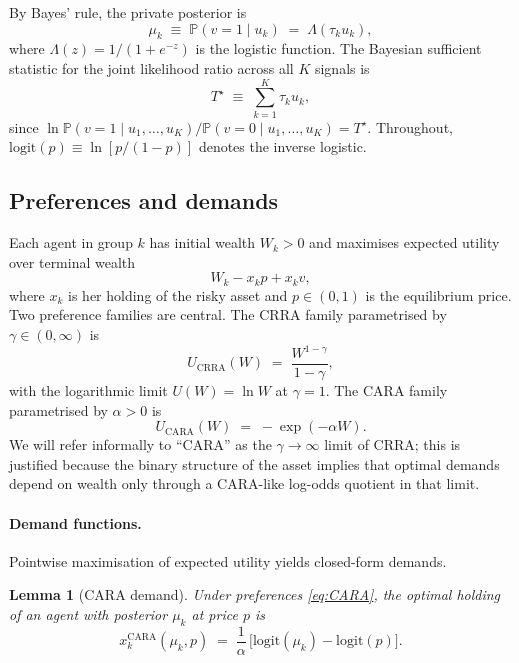 \documentclass[12pt,letterpaper]{article}
\newtheorem{lemma}{Lemma}
\theoremstyle{definition}
\theoremstyle{remark}
\newcommand{\PP}{\mathbb{P}}
\newcommand{\Lam}{\Lambda}            %
\newcommand{\logit}{\mathrm{logit}}
\newcommand{\Tstar}{T^{\!\star}}
\newcommand{\1}{\mathbf{1}}
\begin{document}
By Bayes' rule, the private posterior is
\begin{equation}
   \mu_{k} \;\equiv\; \PP(v=1\mid u_{k}) \;=\; \Lam(\tau_{k}u_{k}),
\label{eq:posterior}
\end{equation}
where $\Lam(z)=1/(1+e^{-z})$ is the logistic function. The Bayesian
sufficient statistic for the joint likelihood ratio across all $K$ signals is
\begin{equation}
   \Tstar \;\equiv\; \sum_{k=1}^{K}\tau_{k}u_{k},
\label{eq:Tstar}
\end{equation}
since $\ln\PP(v=1\mid u_{1},\ldots,u_{K})/\PP(v=0\mid u_{1},\ldots,u_{K})=\Tstar$.
Throughout, $\logit(p)\equiv\ln[p/(1-p)]$ denotes the inverse logistic.

\subsection{Preferences and demands}

Each agent in group $k$ has initial wealth $W_{k}>0$ and maximises expected
utility over terminal wealth
\begin{equation}
   W_{k} - x_{k}p + x_{k}v,
\label{eq:wealth}
\end{equation}
where $x_{k}$ is her holding of the risky asset and $p\in(0,1)$ is the
equilibrium price. Two preference families are central. The CRRA family
parametrised by $\gamma\in(0,\infty)$ is
\begin{equation}
   U_{\mathrm{CRRA}}(W) \;=\; \frac{W^{1-\gamma}}{1-\gamma},
\label{eq:CRRA}
\end{equation}
with the logarithmic limit $U(W)=\ln W$ at $\gamma=1$. The CARA family
parametrised by $\alpha>0$ is
\begin{equation}
   U_{\mathrm{CARA}}(W) \;=\; -\exp(-\alpha W).
\label{eq:CARA}
\end{equation}
We will refer informally to ``CARA'' as the $\gamma\to\infty$ limit of CRRA;
this is justified because the binary structure of the asset implies that
optimal demands depend on wealth only through a CARA-like log-odds quotient
in that limit.

\paragraph{Demand functions.}
Pointwise maximisation of expected utility yields closed-form demands.

\begin{lemma}[CARA demand]\label{lem:cara-demand}
Under preferences \eqref{eq:CARA}, the optimal holding of an agent with
posterior $\mu_{k}$ at price $p$ is
\begin{equation}
   x_{k}^{\mathrm{CARA}}(\mu_{k},p) \;=\;
   \frac{1}{\alpha}\,\bigl[\logit(\mu_{k})-\logit(p)\bigr].
\label{eq:cara-demand}
\end{equation}
\end{lemma}
\end{document}
